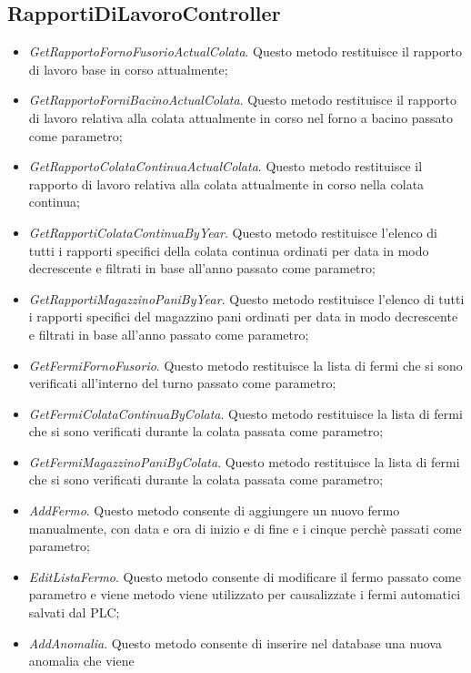   \subsection{RapportiDiLavoroController}
  \begin{itemize}
    \item \textit{GetRapportoFornoFusorioActualColata}. Questo metodo restituisce il rapporto di lavoro base in
    corso attualmente;
    \item \textit{GetRapportoForniBacinoActualColata}. Questo metodo restituisce il rapporto di lavoro relativa alla
    colata attualmente in corso nel forno a bacino passato come parametro;
    \item \textit{GetRapportoColataContinuaActualColata}. Questo metodo restituisce il rapporto di lavoro relativa
    alla colata attualmente in corso nella colata continua;
    \item \textit{GetRapportiColataContinuaByYear}. Questo metodo restituisce l'elenco di tutti i rapporti specifici
    della colata continua ordinati per data in modo decrescente e filtrati in base all'anno passato come parametro;
    \item \textit{GetRapportiMagazzinoPaniByYear}. Questo metodo restituisce l'elenco di tutti i rapporti specifici
    del magazzino pani ordinati per data in modo decrescente e filtrati in base all'anno passato come parametro;
    \item \textit{GetFermiFornoFusorio}. Questo metodo restituisce la lista di fermi che si sono verificati
    all'interno del turno passato come parametro;
    \item \textit{GetFermiColataContinuaByColata}. Questo metodo restituisce la lista di fermi che si sono
    verificati durante la colata passata come parametro;
    \item \textit{GetFermiMagazzinoPaniByColata}. Questo metodo restituisce la lista di fermi che si sono
    verificati durante la colata passata come parametro;
    \item \textit{AddFermo}. Questo metodo consente di aggiungere un nuovo fermo manualmente, con data e ora
    di inizio e di fine e i cinque perchè passati come parametro;
    \item \textit{EditListaFermo}. Questo metodo consente di modificare il fermo passato come parametro e viene
    metodo viene utilizzato per causalizzate i fermi automatici salvati dal PLC;
    \item \textit{AddAnomalia}. Questo metodo consente di inserire nel database una nuova anomalia che viene

\end{itemize}
